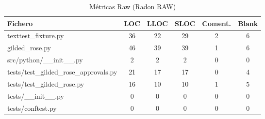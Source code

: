 \documentclass{article}
\begin{document}
\begin{table}[H]
    \centering
    \small
    \begin{tabular}{lccccc}
        \toprule
        \textbf{Fichero}                       & \textbf{LOC} & \textbf{LLOC} & \textbf{SLOC} & \textbf{Coment.} & \textbf{Blank} \\
        \midrule
        texttest\_fixture.py                   & 36           & 22            & 29            & 2                & 6              \\
        gilded\_rose.py                        & 46           & 39            & 39            & 1                & 6              \\
        src/python/\_\_init\_\_.py             & 2            & 2             & 2             & 0                & 0              \\
        tests/test\_gilded\_rose\_approvals.py & 21           & 17            & 17            & 0                & 4              \\
        tests/test\_gilded\_rose.py            & 16           & 10            & 10            & 1                & 5              \\
        tests/\_\_init\_\_.py                  & 0            & 0             & 0             & 0                & 0              \\
        tests/conftest.py                      & 0            & 0             & 0             & 0                & 0              \\
        \bottomrule
    \end{tabular}
    \caption{Métricas Raw (Radon RAW)}
    \label{tab:radon_raw}
\end{table}
\end{document}
